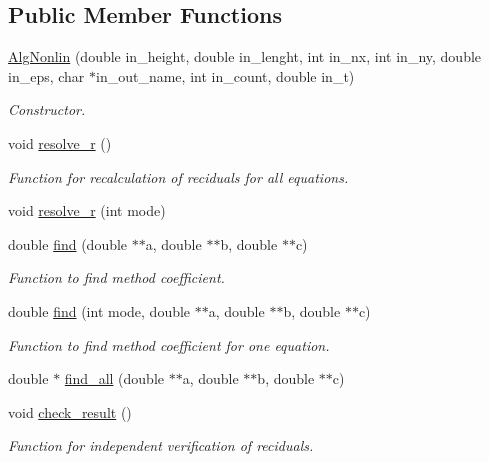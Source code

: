 \subsection*{Public Member Functions}
\begin{DoxyCompactItemize}
\item 
\hyperlink{classAlgNonlin_a3a4b7b0afb7e2ef2cc3f09b6d35fec42}{AlgNonlin} (double in\_\-height, double in\_\-lenght, int in\_\-nx, int in\_\-ny, double in\_\-eps, char $\ast$in\_\-out\_\-name, int in\_\-count, double in\_\-t)
\begin{DoxyCompactList}\small\item\em Constructor. \end{DoxyCompactList}\item 
\hypertarget{classAlgNonlin_a575576e90c96d93b28debdf30f51e741}{
void \hyperlink{classAlgNonlin_a575576e90c96d93b28debdf30f51e741}{resolve\_\-r} ()}
\label{classAlgNonlin_a575576e90c96d93b28debdf30f51e741}

\begin{DoxyCompactList}\small\item\em Function for recalculation of reciduals for all equations. \end{DoxyCompactList}\item 
void \hyperlink{classAlgNonlin_a28bbb13e708a32cf4f191db56325e52c}{resolve\_\-r} (int mode)
\item 
double \hyperlink{classAlgNonlin_ae7c521438daed488cd69b131292f2a8a}{find} (double $\ast$$\ast$a, double $\ast$$\ast$b, double $\ast$$\ast$c)
\begin{DoxyCompactList}\small\item\em Function to find method coefficient. \end{DoxyCompactList}\item 
double \hyperlink{classAlgNonlin_a164094279ad86962c650221b112c9223}{find} (int mode, double $\ast$$\ast$a, double $\ast$$\ast$b, double $\ast$$\ast$c)
\begin{DoxyCompactList}\small\item\em Function to find method coefficient for one equation. \end{DoxyCompactList}\item 
double $\ast$ \hyperlink{classAlgNonlin_a3f3bdece3eb2ccaffeb7c19bd318121e}{find\_\-all} (double $\ast$$\ast$a, double $\ast$$\ast$b, double $\ast$$\ast$c)
\item 
\hypertarget{classAlgNonlin_a885ddfe1f2181d777f98503d66480e1c}{
void \hyperlink{classAlgNonlin_a885ddfe1f2181d777f98503d66480e1c}{check\_\-result} ()}
\label{classAlgNonlin_a885ddfe1f2181d777f98503d66480e1c}

\begin{DoxyCompactList}\small\item\em Function for independent verification of reciduals. \end{DoxyCompactList}\end{DoxyCompactItemize}


